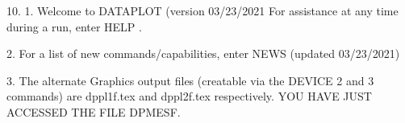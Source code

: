 10.
1. Welcome to DATAPLOT (version 03/23/2021  For assistance at
   any time during a run, enter HELP   .

2. For a list of new commands/capabilities,
   enter NEWS  (updated 03/23/2021)

3. The alternate Graphics output files (creatable
   via the DEVICE 2 and 3 commands) are
   dppl1f.tex and dppl2f.tex respectively.
YOU HAVE JUST ACCESSED THE FILE DPMESF.
